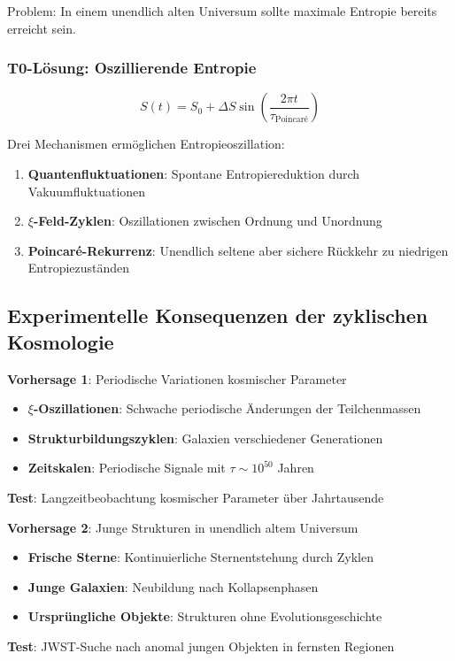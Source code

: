 \documentclass[12pt,a4paper]{article}
\theoremstyle{definition}
\begin{document}
	Problem: In einem unendlich alten Universum sollte maximale Entropie bereits erreicht sein.
	
	\subsubsection{T0-Lösung: Oszillierende Entropie}
	\begin{equation}
		S(t) = S_0 + \Delta S \sin\left(\frac{2\pi t}{\tau_{\text{Poincaré}}}\right)
	\end{equation}
	
	\begin{important}
		Drei Mechanismen ermöglichen Entropieoszillation:
		\begin{enumerate}
			\item \textbf{Quantenfluktuationen}: Spontane Entropiereduktion durch Vakuumfluktuationen
			\item \textbf{$\xi$-Feld-Zyklen}: Oszillationen zwischen Ordnung und Unordnung
			\item \textbf{Poincaré-Rekurrenz}: Unendlich seltene aber sichere Rückkehr zu niedrigen Entropiezuständen
		\end{enumerate}
	\end{important}
	
	\subsection{Experimentelle Konsequenzen der zyklischen Kosmologie}
	
	\begin{experiment}
		\textbf{Vorhersage 1}: Periodische Variationen kosmischer Parameter
		\begin{itemize}
			\item \textbf{$\xi$-Oszillationen}: Schwache periodische Änderungen der Teilchenmassen
			\item \textbf{Strukturbildungszyklen}: Galaxien verschiedener Generationen 
			\item \textbf{Zeitskalen}: Periodische Signale mit $\tau \sim 10^{50}$ Jahren
		\end{itemize}
		\textbf{Test}: Langzeitbeobachtung kosmischer Parameter über Jahrtausende
	\end{experiment}
	
	\begin{experiment}
		\textbf{Vorhersage 2}: Junge Strukturen in unendlich altem Universum  
		\begin{itemize}
			\item \textbf{Frische Sterne}: Kontinuierliche Sternentstehung durch Zyklen
			\item \textbf{Junge Galaxien}: Neubildung nach Kollapsenphasen
			\item \textbf{Ursprüngliche Objekte}: Strukturen ohne Evolutionsgeschichte
		\end{itemize}
		\textbf{Test}: JWST-Suche nach anomal jungen Objekten in fernsten Regionen
	\end{experiment}
	
\end{document}
